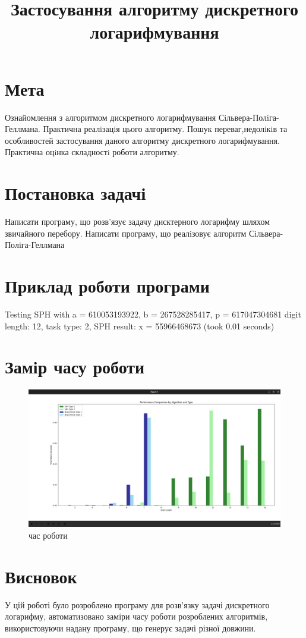 \documentclass{article}
\title{Застосування алгоритму дискретного логарифмування}
\date{}
\begin{document}
\maketitle

\section{Мета}
\quad Ознайомлення з алгоритмом дискретного логарифмування Сiльвера-Полiга-Геллмана. Практична реалiзацiя цього алгоритму. Пошук переваг,недолiкiв та особливостей застосування даного алгоритму дискретного логарифмування. Практична оцiнка складностi роботи алгоритму.

\section{Постановка задачі}
\quad Написати програму, що розв’язує задачу дисктерного логарифму шляхом звичайного перебору. Написати програму, що реалiзовує алгоритм Сiльвера-Полiга-Геллмана

\section{Приклад роботи програми}
\quad 
Testing SPH with a = 610053193922, b = 267528285417, p = 617047304681
digit length: 12, task type: 2, SPH result: x = 55966468673 (took 0.01 seconds)

\section{Замір часу роботи}
\quad 
\begin{figure}[htbp]
    \centering
    \includegraphics[width=1.0\textwidth]{time.png}
    \caption{час роботи}
    \label{fig:screenshot}
\end{figure}

\section{Висновок}
\quad
У цій роботі було розроблено програму для розв'язку задачі дискретного логарифму, автоматизовано заміри часу роботи розроблених алгоритмів, використовуючи надану програму, що генерує задачі різної довжини.
\end{document}

